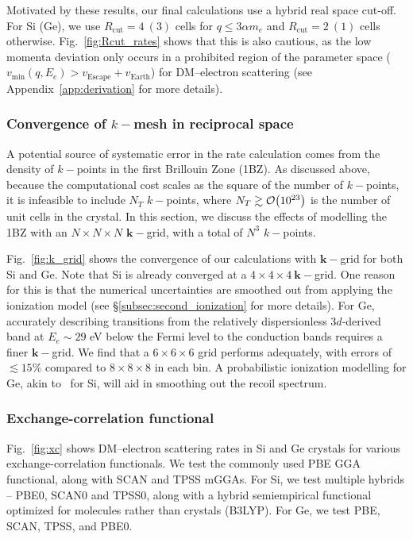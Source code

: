 \documentclass[
    prd, twocolumn, superscriptaddress, nofootinbib, amsmath, amssymb,
    aps, floatfix,preprintnumbers
]{revtex4-2}
\begin{document}
        Motivated by these results, our final calculations use a hybrid real space cut-off. For Si (Ge), we use $R_\mathrm{cut} = 4\ (3)$ cells for $q\leq3\alpha m_e$ and $R_\mathrm{cut} = 2\ (1)$ cells otherwise. Fig.~\ref{fig:Rcut_rates} shows that this is also cautious, as the low momenta deviation only occurs in a prohibited region of the parameter space ($v_\mathrm{min}(q, E_e) > v_\mathrm{Escape} + v_\mathrm{Earth}$) for DM--electron scattering (see Appendix~\ref{app:derivation} for more details).

        \subsubsection{Convergence of $k-$mesh in reciprocal space}\label{subsubsec:k-grid_uncertainty}
        
        A potential source of systematic error in the rate calculation comes from the density of $k-$points in the first Brillouin Zone (1BZ). As discussed above, because the computational cost scales as the square of the number of $k-$points, it is infeasible to include $N_T$ $k-$points, where $N_T\gtrsim\order{10^{23}}$ is the number of unit cells in the crystal. In this section, we discuss the effects of modelling the 1BZ with an $N\times N\times N$ $\mathbf{k}-$grid, with a total of $N^3$ $k-$points.
        
        Fig.~\ref{fig:k_grid} shows the convergence of our calculations with $\mathbf{k}-$grid for both Si and Ge. Note that Si is already converged at a $4\times4\times4\ \mathbf{k}-$grid. One reason for this is that the numerical uncertainties are smoothed out from applying the ionization model (see \S\ref{subsec:second_ionization} for more details). For Ge, accurately describing transitions from the relatively dispersionless 3$d$-derived band at $E_e \sim 29$ eV below the Fermi level to the conduction bands requires a finer $\mathbf{k}-$grid. We find that a $6\times6\times6$ grid performs adequately, with errors of  $\lesssim 15\%$ compared to $8\times8\times8$ in each bin. A probabilistic ionization modelling for Ge, akin to~ for Si, will aid in smoothing out the recoil spectrum.

        
        \subsubsection{Exchange-correlation functional}\label{subsubsec:XC_uncertainty}
        
        Fig.~\ref{fig:xc} shows DM--electron scattering rates in Si and Ge crystals for various exchange-correlation functionals. We test the commonly used PBE GGA functional, along with SCAN and TPSS mGGAs. For Si, we test multiple hybrids -- PBE0, SCAN0 and TPSS0, along with a hybrid semiempirical functional optimized for molecules rather than crystals (B3LYP). For Ge, we test PBE, SCAN, TPSS, and PBE0. 
    
\end{document}
